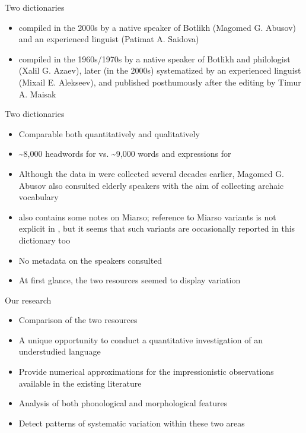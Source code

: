 \begin{frame}{Two dictionaries}
\begin{itemize}
    \item \citep{saidovaabusov2012} compiled in the 2000s by a native speaker of Botlikh (Magomed G. Abusov) and an experienced linguist (Patimat A. Saidova)
    \item \citep{alekseev2019} compiled in the 1960s/1970s by a native speaker of Botlikh and philologist (Xalil G. Azaev), later (in the 2000s) systematized by an experienced linguist (Mixail E. Alekseev), and published posthumously after the editing by Timur A. Maisak
\end{itemize}
\end{frame}

\begin{frame}{Two dictionaries}
\begin{itemize}
    \item Comparable both quantitatively and qualitatively
    \item \textasciitilde{}8,000 headwords for \citep{saidovaabusov2012} vs. \textasciitilde{}9,000 words and expressions for \citep{alekseev2019}
    \item Although the data in \citep{alekseev2019} were collected several decades earlier, Magomed G. Abusov also consulted elderly speakers with the aim of collecting archaic vocabulary 
    \item \citep{saidovaabusov2012} also contains some notes on Miarso; reference to Miarso variants is not explicit in \citep{alekseev2019}, but it seems that such variants are occasionally reported in this dictionary too
    \item No metadata on the speakers consulted
    \item At first glance, the two resources seemed to display variation
\end{itemize}
\end{frame}

\begin{frame}{Our research}
\begin{itemize}
    \item Comparison of the two resources
    \item A unique opportunity to conduct a quantitative investigation of an understudied language
    \item Provide numerical approximations for the impressionistic observations available in the existing literature
    \item Analysis of both phonological and morphological features 
    \item Detect patterns of systematic variation within these two areas
\end{itemize}
\end{frame}

